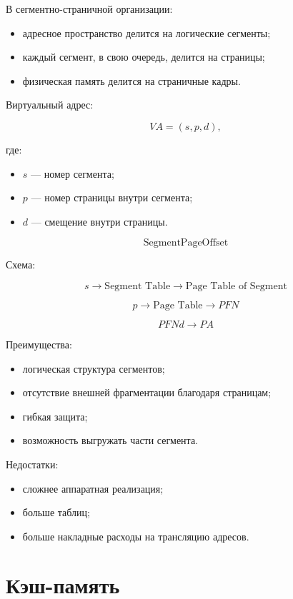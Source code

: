 \documentclass[12pt,a4paper]{article}
\theoremstyle{remark}
\begin{document}
В сегментно-страничной организации:
\begin{itemize}
    \item адресное пространство делится на логические сегменты;
    \item каждый сегмент, в свою очередь, делится на страницы;
    \item физическая память делится на страничные кадры.
\end{itemize}

Виртуальный адрес:

\[
VA = (s, p, d),
\]

где:
\begin{itemize}
    \item $s$ --- номер сегмента;
    \item $p$ --- номер страницы внутри сегмента;
    \item $d$ --- смещение внутри страницы.
\end{itemize}

\[
\boxed{\text{Segment}}
\boxed{\text{Page}}
\boxed{\text{Offset}}
\]

Схема:

\[
\boxed{s}
\rightarrow
\boxed{\text{Segment Table}}
\rightarrow
\boxed{\text{Page Table of Segment}}
\]

\[
\boxed{p}
\rightarrow
\boxed{\text{Page Table}}
\rightarrow
\boxed{PFN}
\]

\[
\boxed{PFN}
\boxed{d}
\rightarrow
\boxed{PA}
\]

Преимущества:
\begin{itemize}
    \item логическая структура сегментов;
    \item отсутствие внешней фрагментации благодаря страницам;
    \item гибкая защита;
    \item возможность выгружать части сегмента.
\end{itemize}

Недостатки:
\begin{itemize}
    \item сложнее аппаратная реализация;
    \item больше таблиц;
    \item больше накладные расходы на трансляцию адресов.
\end{itemize}

\section{Кэш-память}
\end{document}
